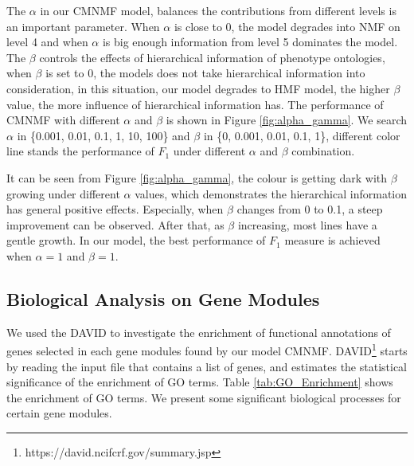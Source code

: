 \documentclass{bmcart}
\begin{document}
The $\alpha$ in our CMNMF model, balances the contributions from different levels is an important parameter. When $\alpha$ is close to 0, the model degrades into NMF on level 4 and when $\alpha$ is big enough information from level 5 dominates the model. The $\beta$ controls the effects of hierarchical information of phenotype ontologies, when $\beta$ is set to 0, the models does not take hierarchical information into consideration, in this situation, our model degrades to HMF model, the higher $\beta$ value, the more influence of hierarchical information has.
 The performance of CMNMF with different $\alpha$ and $\beta$ is shown in Figure \ref{fig:alpha_gamma}. We search $\alpha$ in \{0.001, 0.01, 0.1, 1, 10, 100\} and $\beta$ in \{0, 0.001, 0.01, 0.1, 1\}, different color line stands the performance of $F_1$ under different $\alpha$ and $\beta$ combination.

It can be seen from Figure \ref{fig:alpha_gamma}, the colour is getting dark with $\beta$ growing under different $\alpha$ values, which demonstrates the hierarchical information has general positive effects. Especially, when $\beta$ changes from 0 to 0.1, a steep improvement can be observed. After that, as $\beta$ increasing, most lines have a gentle growth. In our model, the best performance of $F_1$ measure is achieved when $\alpha=1$ and $\beta = 1$.

\subsection*{\textbf{Biological Analysis on Gene Modules}}%

We used the DAVID \cite{Dennis2003} to investigate the enrichment of functional annotations of genes selected in each gene modules found by our model CMNMF. DAVID\footnote{https://david.ncifcrf.gov/summary.jsp} starts by reading the input file that contains a list of genes, and estimates the statistical significance of the enrichment of GO terms.
Table \ref{tab:GO_Enrichment} shows the enrichment of GO terms. We present some significant biological processes for certain  gene modules.
\end{document}
